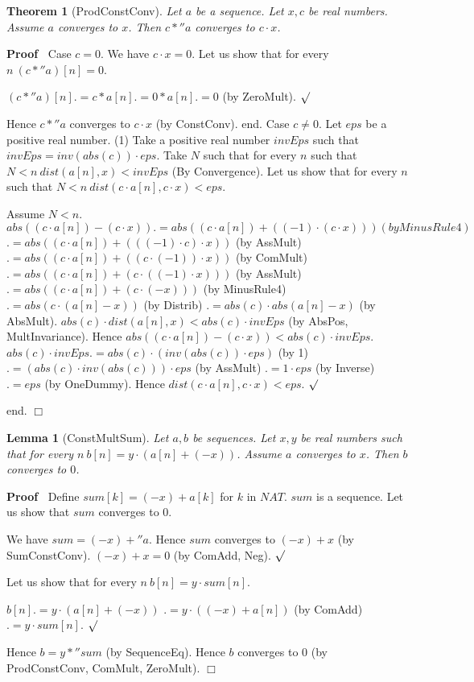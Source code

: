 \documentclass{article}
\newenvironment{forthel}{\begin{leftbar}}{\end{leftbar}}
\newenvironment{proof}{\noindent\textbf{Proof\ }}{\hspace*{\fill}$\Box$\medskip}
\newenvironment{subproof}{\begin{list}{}{}
		\item[\text{Proof}]}{\hfill $\surd$ \end{list}}
\newtheorem{lemma}{Lemma}
\newtheorem{theorem}{Theorem}
\begin{document}
\begin{forthel}
	\begin{theorem}[ProdConstConv]
	Let $a$ be a sequence. Let $x,c$ be real numbers. Assume $a$ converges to $x$.
	Then $c *'' a$ converges to $c \cdot x$.
	\end{theorem}
	\begin{proof}
	Case $c = 0$.
	We have $c \cdot x = 0$.
	Let us show that for every $n \ (c *'' a)[n] = 0$. 
	\begin{subproof}
	$(c *'' a)[n] .= c * a[n]
	.= 0 * a[n]
	.= 0$ (by ZeroMult).
	\end{subproof}
	Hence $c *'' a$ converges to $c \cdot x$ (by ConstConv).
	end.
	Case $c \neq 0$.
	Let $eps$ be a positive real number. 
	(1)     Take a positive real number $invEps$ such that $invEps = inv(abs(c)) \cdot eps$.
	Take $N$ such that for every $n$ such that $N < n \ dist(a[n],x) < invEps$ (By Convergence).
	Let us show that for every $n$ such that $N < n \ dist(c \cdot a[n],c \cdot x) < eps$.
	\begin{subproof}
	Assume $N < n$.
	$abs((c \cdot a[n]) - (c \cdot x)) .= abs((c \cdot a[n]) +  ((-1) \cdot (c \cdot x))) (by MinusRule4)$ 
	$.= abs((c \cdot a[n]) + (((-1) \cdot c) \cdot x))$ (by AssMult)
	$.= abs((c \cdot a[n]) + ((c \cdot (-1)) \cdot x))$ (by ComMult)
	$.= abs((c \cdot a[n]) + (c \cdot ((-1) \cdot x)))$ (by AssMult)
	$.= abs((c \cdot a[n]) + (c \cdot (-x)))$ (by MinusRule4)
	$.= abs(c \cdot (a[n] - x))$ (by Distrib)
	$.= abs(c) \cdot abs(a[n] - x)$ (by AbsMult).
	$abs(c) \cdot dist(a[n],x) < abs(c) \cdot invEps$ (by AbsPos, MultInvariance).
	Hence $abs((c \cdot a[n]) - (c \cdot x)) < abs(c) \cdot invEps$.
	$abs(c) \cdot invEps .= abs(c) \cdot (inv(abs(c)) \cdot eps)$ (by 1)
	$.= (abs(c) \cdot inv(abs(c))) \cdot eps$ (by AssMult)
	$.= 1 \cdot eps$ (by Inverse)
	$.= eps$ (by OneDummy).
	Hence $dist(c \cdot a[n],c \cdot x) < eps$.
	\end{subproof}
	end.
	\end{proof}

	\begin{lemma}[ConstMultSum]
	Let $a,b$ be sequences. Let $x,y$ be real numbers such that for every $n\ b[n] = y \cdot (a[n] + (-x))$. Assume $a$ converges to $x$.
	Then $b$ converges to $0$.
	\end{lemma}
	\begin{proof}
	Define $sum[k] = (-x) + a[k]$ for $k$ in $NAT$.
	$sum$ is a sequence.
	Let us show that $sum$ converges to $0$.
	\begin{subproof}
	We have $sum = (-x) +'' a$.
	Hence $sum$ converges to $(-x) + x$ (by SumConstConv).
	$(-x) + x = 0$ (by ComAdd, Neg).
	\end{subproof}
	Let us show that for every $n\ b[n] = y \cdot sum[n]$.
	\begin{subproof}
	$b[n] .= y \cdot (a[n] + (-x))$
	$.= y \cdot ((-x) + a[n])$ (by ComAdd)
	$.= y \cdot sum[n]$.
	\end{subproof}
	Hence $b = y *'' sum$ (by SequenceEq).
	Hence $b$ converges to $0$ (by ProdConstConv, ComMult, ZeroMult).
	\end{proof}
	

\end{forthel}
\end{document}
